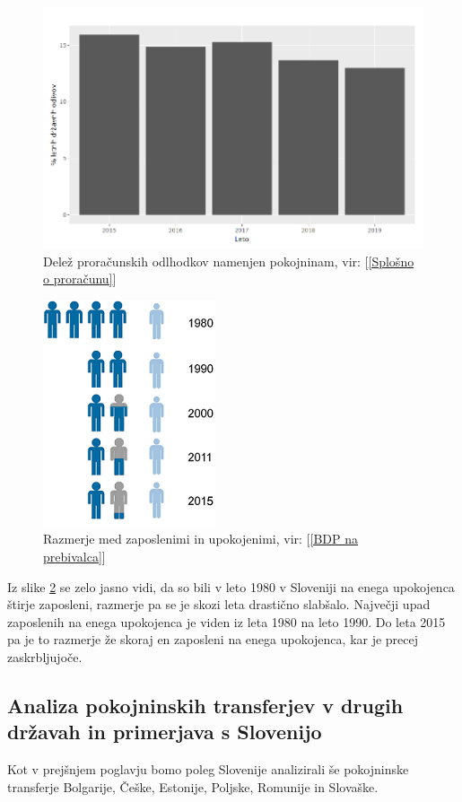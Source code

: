 \documentclass[12pt, a4paper]{article}
\begin{document}
\begin{figure}[t!]
\centering
\includegraphics[height = 7 cm]{pokojnine_procentualno.png}
\caption{Delež proračunskih odlhodkov namenjen pokojninam, vir: [\ref{Splošno o proračunu}]}
\label{Slika 7}
\end{figure}

\begin{figure}[h!]
\centering
\includegraphics[height = 7 cm]{razmerje_med_zaposlenimi_in_upokojenimi_2015.png}
\caption{Razmerje med zaposlenimi in upokojenimi, vir: [\ref{BDP na prebivalca}]}
\label{Slika 8}
\end{figure}

Iz slike \ref{Slika 8} se zelo jasno vidi, da so bili v leto 1980 v Sloveniji na enega upokojenca štirje zaposleni, razmerje pa se je skozi leta drastično slabšalo. Največji upad zaposlenih na enega upokojenca je viden iz leta 1980 na leto 1990. Do leta 2015 pa je to razmerje že skoraj en zaposleni na enega upokojenca, kar je precej zaskrbljujoče.

\newpage

\newpage
\subsection{Analiza pokojninskih transferjev v drugih državah in primerjava s Slovenijo}
\hspace*{5mm} Kot v prejšnjem poglavju bomo poleg Slovenije analizirali še pokojninske transferje Bolgarije, Češke, Estonije, Poljske, Romunije in Slovaške.
\end{document}

